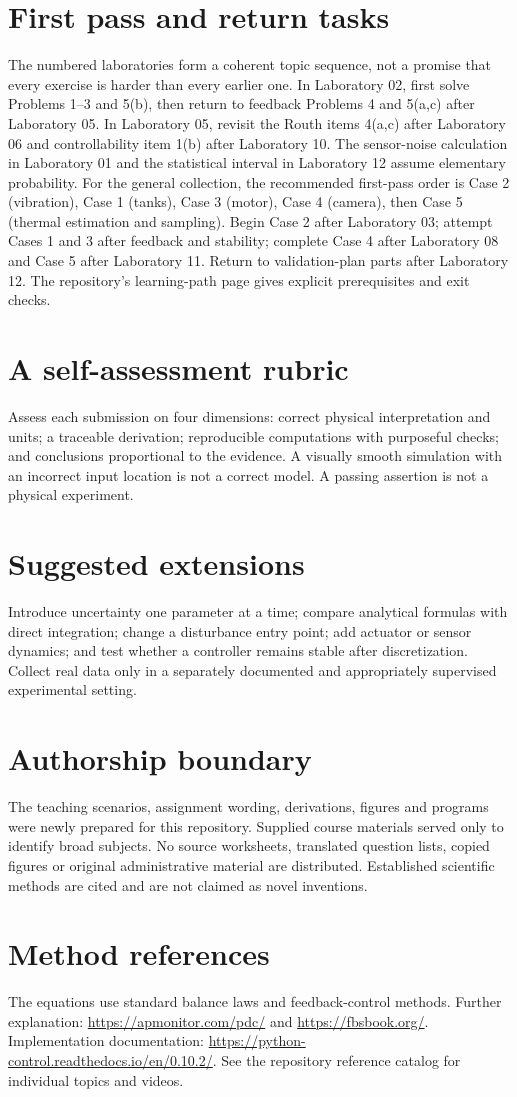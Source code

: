\documentclass[10pt,a4paper]{article}
\begin{document}
\section{First pass and return tasks}
The numbered laboratories form a coherent topic sequence, not a promise that every exercise is harder than every earlier one. In Laboratory 02, first solve Problems 1--3 and 5(b), then return to feedback Problems 4 and 5(a,c) after Laboratory 05. In Laboratory 05, revisit the Routh items 4(a,c) after Laboratory 06 and controllability item 1(b) after Laboratory 10. The sensor-noise calculation in Laboratory 01 and the statistical interval in Laboratory 12 assume elementary probability.
For the general collection, the recommended first-pass order is Case 2 (vibration), Case 1 (tanks), Case 3 (motor), Case 4 (camera), then Case 5 (thermal estimation and sampling). Begin Case 2 after Laboratory 03; attempt Cases 1 and 3 after feedback and stability; complete Case 4 after Laboratory 08 and Case 5 after Laboratory 11. Return to validation-plan parts after Laboratory 12. The repository's learning-path page gives explicit prerequisites and exit checks.

\section{A self-assessment rubric}
Assess each submission on four dimensions: correct physical interpretation and units; a traceable derivation; reproducible computations with purposeful checks; and conclusions proportional to the evidence. A visually smooth simulation with an incorrect input location is not a correct model. A passing assertion is not a physical experiment.
\section{Suggested extensions}
Introduce uncertainty one parameter at a time; compare analytical formulas with direct integration; change a disturbance entry point; add actuator or sensor dynamics; and test whether a controller remains stable after discretization. Collect real data only in a separately documented and appropriately supervised experimental setting.
\section{Authorship boundary}
The teaching scenarios, assignment wording, derivations, figures and programs were newly prepared for this repository. Supplied course materials served only to identify broad subjects. No source worksheets, translated question lists, copied figures or original administrative material are distributed. Established scientific methods are cited and are not claimed as novel inventions.
\section{Method references}
The equations use standard balance laws and feedback-control methods. Further explanation: \url{https://apmonitor.com/pdc/} and \url{https://fbsbook.org/}. Implementation documentation: \url{https://python-control.readthedocs.io/en/0.10.2/}. See the repository reference catalog for individual topics and videos.
\end{document}
